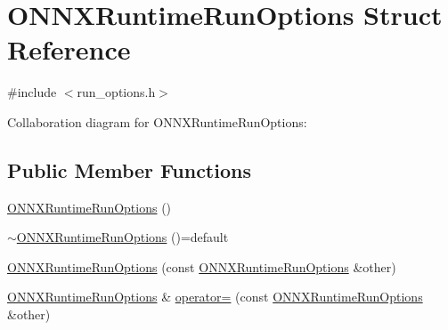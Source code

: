 \hypertarget{structONNXRuntimeRunOptions}{}\section{O\+N\+N\+X\+Runtime\+Run\+Options Struct Reference}
\label{structONNXRuntimeRunOptions}


{\ttfamily \#include $<$run\+\_\+options.\+h$>$}



Collaboration diagram for O\+N\+N\+X\+Runtime\+Run\+Options\+:
\subsection*{Public Member Functions}
\begin{DoxyCompactItemize}
\item 
\mbox{\hyperlink{structONNXRuntimeRunOptions_a58d2e67e2a2bdc71030e77c26fbc60c9}{O\+N\+N\+X\+Runtime\+Run\+Options}} ()
\item 
\mbox{\hyperlink{structONNXRuntimeRunOptions_a7f93c0aea6eaf6a56fb0b219a2e1ec87}{$\sim$\+O\+N\+N\+X\+Runtime\+Run\+Options}} ()=default
\item 
\mbox{\hyperlink{structONNXRuntimeRunOptions_a5509448cadbcc0c4d687f9e77e615bd1}{O\+N\+N\+X\+Runtime\+Run\+Options}} (const \mbox{\hyperlink{structONNXRuntimeRunOptions}{O\+N\+N\+X\+Runtime\+Run\+Options}} \&other)
\item 
\mbox{\hyperlink{structONNXRuntimeRunOptions}{O\+N\+N\+X\+Runtime\+Run\+Options}} \& \mbox{\hyperlink{structONNXRuntimeRunOptions_a83ca2c989a39fd1d1a36c10690edd900}{operator=}} (const \mbox{\hyperlink{structONNXRuntimeRunOptions}{O\+N\+N\+X\+Runtime\+Run\+Options}} \&other)
\end{DoxyCompactItemize}
